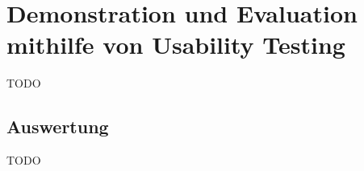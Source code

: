 \section{Demonstration und Evaluation mithilfe von Usability Testing}
TODO

\subsection{Auswertung}
TODO